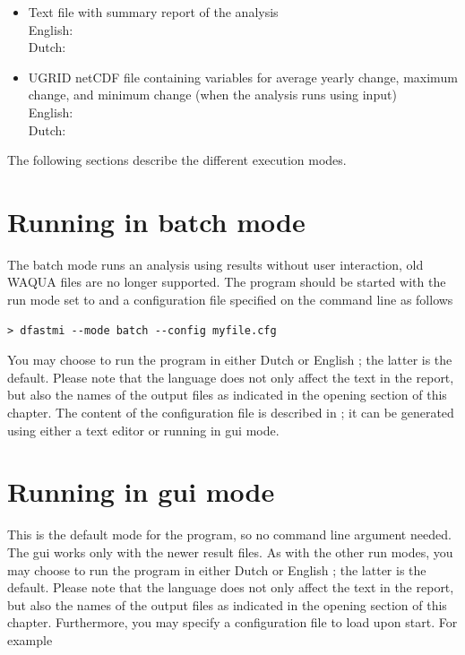 \begin{itemize}
\item Text file with summary report of the analysis \\
English:  \\
Dutch: 
\item UGRID netCDF file containing variables for average yearly change, maximum change, and minimum change (when the analysis runs using \dflowfm input) \\
English:  \\
Dutch: 
\end{itemize}

The following sections describe the different execution modes.

\section{Running in batch mode}

The batch mode runs an analysis using \dflowfm results without user interaction, old WAQUA files are no longer supported.
The program should be started with the run mode set to  and a configuration file specified on the command line as follows

\begin{Verbatim}
> dfastmi --mode batch --config myfile.cfg
\end{Verbatim}

You may choose to run the program in either Dutch  or English ; the latter is the default.
Please note that the language does not only affect the text in the report, but also the names of the output files as indicated in the opening section of this chapter.
The content of the configuration file is described in ; it can be generated using either a text editor or \dfastmi running in gui mode.

\section{Running in gui mode}

This is the default mode for the program, so no command line argument needed.
The gui works only with the newer \dflowfm result files.
As with the other run modes, you may choose to run the program in either Dutch  or English ; the latter is the default.
Please note that the language does not only affect the text in the report, but also the names of the output files as indicated in the opening section of this chapter.
Furthermore, you may specify a configuration file to load upon start.
For example

